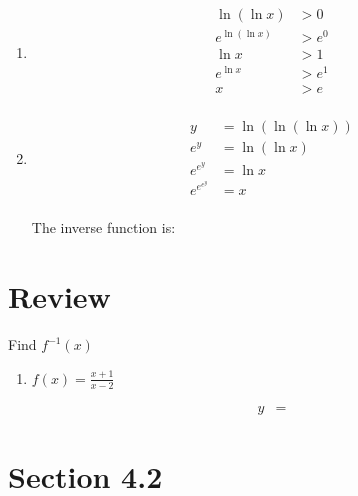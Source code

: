 \documentclass{exam}
\begin{document}
\begin{description}
\begin{enumerate}[a]
          \item 
            \begin{align*}
              \ln(\ln x)     & > 0 \\
              e^{\ln(\ln x)} & > e^0 \\
              \ln x          & > 1 \\
              e^{\ln x}      & > e^1 \\
              x              & > e \\
            \end{align*}


          \item 
            \begin{align*}
              y        &= \ln(\ln(\ln x)) \\
              e^y      &= \ln(\ln x) \\
              e^{e^y}      &= \ln x \\
              e^{e^{e^y}}      &= x \\
            \end{align*}

            The inverse function is: 
        \end{enumerate}
    \end{description}

  \section{Review}

  Find $f^{-1}(x)$

  \begin{enumerate}

    \item $f(x) = \frac{x + 1}{x - 2}$
      \begin{solution}
        \begin{align*}
          y &= 
        \end{align*}
      \end{solution}

  \end{enumerate}
    \section{Section 4.2}
\end{document}
